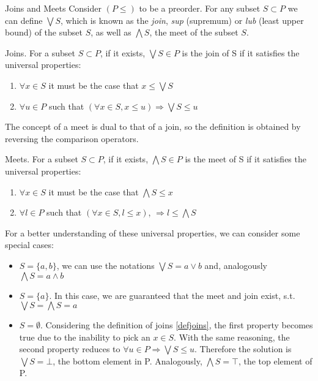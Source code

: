     \begin{section}{Joins and Meets}
        Consider $(P \leq)$ to be a preorder. For any subset $S \subset P$ we can define 
        $\bigvee S$, which is known as the \emph{join}, \emph{sup} (supremum) or \emph{lub} 
        (least upper bound) of the subset $S$, as well as $\bigwedge S$, the meet of the subset $S$.
        \begin{definition}\label{defjoins}{Joins.} 
            For a subset $S \subset P$, if it exists, $\bigvee S \in P$ is the join of S if
            it satisfies the universal properties:
                \begin{enumerate}
                    \item $\forall x \in S$ it must be the case that $x \leq \bigvee S$ 
                    \item $\forall u \in P$ such that $(\forall x \in S, x \leq u) \Rightarrow \bigvee S \leq u$
                \end{enumerate}
        \end{definition}
    
        The concept of a meet is dual to that of a join, so the definition is obtained
        by reversing the comparison operators.
    
        \begin{definition}\label{defmeets}{Meets.}
            For a subset $S \subset P$, if it exists, $\bigwedge S \in P$ is the meet of S if 
            it satisfies the universal properties:
                \begin{enumerate} 
                    \item $\forall x \in S$ it must be the case that $ \bigwedge S \leq x$
                    \item $\forall l \in P$ such that $(\forall x \in S, l \leq x)$, $ \Rightarrow l \leq \bigwedge S$    
                \end{enumerate}
        \end{definition}
        For a better understanding of these universal properties, we can consider some 
        special cases:
        \begin{itemize}
            \item $S = \{a, b\}$, we can use the notations $\bigvee S = a \vee b$ 
                and, analogously $\bigwedge S = a \wedge b$
            \item $S = \{a\}$. In this case, we are guaranteed that the meet and 
                join exist, s.t. $\bigvee S = \bigwedge S = a$
            \item $S = \emptyset$. Considering the definition of joins \ref{defjoins},
                the first property becomes true due to the inability to pick an $x \in S$. With the same reasoning, the second property reduces to $\forall u \in P \Rightarrow \bigvee S \leq u$.
                Therefore the solution is $\bigvee S = \bot$, the bottom element in P.
                Analogously, $\bigwedge S = \top$, the top element of P.
        \end{itemize} 
    

\end{section}
